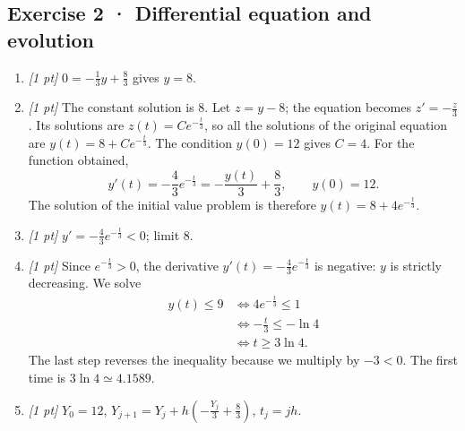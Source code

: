 \subsection*{Exercise 2 · Differential equation and evolution}\begin{enumerate}

\item \textit{[1 pt]} $0=-\frac{1}{3}y+\frac{8}{3}$ gives $y=8$.

\item \textit{[1 pt]} The constant solution is $8$. Let $z=y-8$; the equation becomes $z'=-\frac{z}{3}$. Its solutions are $z(t)=Ce^{-\frac{t}{3}}$, so all the solutions of the original equation are $y(t)=8+Ce^{-\frac{t}{3}}$.
The condition $y(0)=12$ gives $C=4$. For the function obtained,
\[y'(t)=-\frac{4}{3}e^{-\frac{t}{3}}=-\frac{y(t)}{3}+\frac{8}{3},\qquad y(0)=12.\]
The solution of the initial value problem is therefore $y(t)=8+4e^{-\frac{t}{3}}$.

\item \textit{[1 pt]} $y'=-\frac{4}{3}e^{-\frac{t}{3}}<0$; limit $8$.

\item \textit{[1 pt]} Since $e^{-\frac{t}{3}}>0$, the derivative $y'(t)=-\frac{4}{3}e^{-\frac{t}{3}}$ is negative: $y$ is strictly decreasing. We solve
\[\begin{aligned}y(t)\le 9&\Longleftrightarrow 4e^{-\frac{t}{3}}\le1\\&\Longleftrightarrow -\frac{t}{3}\le-\ln 4\\&\Longleftrightarrow t\ge 3\ln 4.\end{aligned}\]
The last step reverses the inequality because we multiply by $-3<0$. The first time is $3\ln 4\simeq\num{4,1589}$.

\item \textit{[1 pt]} $Y_0=12$, $Y_{j+1}=Y_j+h(-\frac{Y_j}{3}+\frac{8}{3})$, $t_j=jh$.

\end{enumerate}

